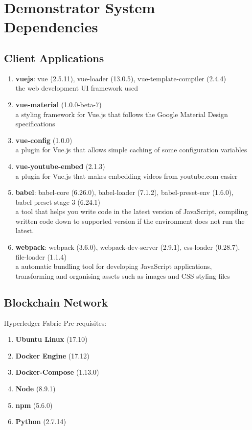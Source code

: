 
\chapter{Demonstrator System Dependencies}

\section{Client Applications}

\begin{enumerate}
	\setlength\itemsep{0em}
	\item \textbf{vuejs}: vue (2.5.11), vue-loader (13.0.5), vue-template-compiler (2.4.4)\\
	      the web development UI framework used
	\item \textbf{vue-material} (1.0.0-beta-7)\\
	      a styling framework for Vue.js that follows the Google Material Design specifications
	\item \textbf{vue-config} (1.0.0)\\
	      a plugin for Vue.js that allows simple caching of some configuration variables
	\item \textbf{vue-youtube-embed} (2.1.3)\\
	      a plugin for Vue.js that makes embedding videos from youtube.com easier
	\item \textbf{babel}: babel-core (6.26.0), babel-loader (7.1.2), babel-preset-env (1.6.0), babel-preset-stage-3 (6.24.1)\\
	      a tool that helps you write code in the latest version of JavaScript, compiling written code down to supported version if the environment does not run the latest.
	\item \textbf{webpack}: webpack (3.6.0), webpack-dev-server (2.9.1), css-loader (0.28.7), file-loader (1.1.4)\\
	      a automatic bundling tool for developing JavaScript applications, transforming and organising assets such as images and CSS styling files
\end{enumerate}

\section{Blockchain Network}

\hspace{\parindent}Hyperledger Fabric Pre-requisites:
\begin{enumerate}
	\setlength\itemsep{0em}
	\item \textbf{Ubuntu Linux} (17.10)
	\item \textbf{Docker Engine} (17.12)
	\item \textbf{Docker-Compose} (1.13.0)
	\item \textbf{Node} (8.9.1)
	\item \textbf{npm} (5.6.0)
	\item \textbf{Python} (2.7.14)	
\end{enumerate}

